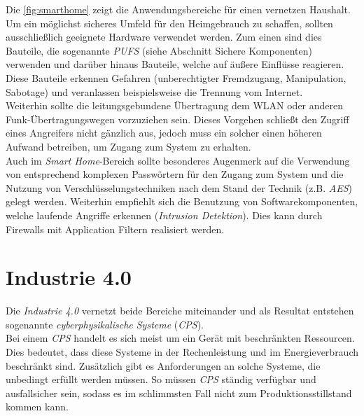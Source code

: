 \documentclass[conference]{IEEEtran}
\begin{document}
Die \autoref{fig:smarthome} zeigt die Anwendungsbereiche für einen vernetzen Haushalt.
Um ein möglichst sicheres Umfeld für den Heimgebrauch zu schaffen, sollten ausschließlich geeignete Hardware verwendet werden. Zum einen sind dies Bauteile, die sogenannte \textit{PUFS} (siehe Abschnitt Sichere Komponenten) verwenden und darüber hinaus Bauteile, welche auf äußere Einflüsse reagieren. Diese Bauteile erkennen Gefahren (unberechtigter Fremdzugang, Manipulation, Sabotage) und veranlassen beispielsweise die Trennung vom Internet\cite{landkrim}. \\
Weiterhin sollte die leitungsgebundene Übertragung dem WLAN oder anderen Funk-Übertragungswegen vorzuziehen sein. Dieses Vorgehen schließt den Zugriff eines Angreifers nicht gänzlich aus, jedoch muss ein solcher einen höheren Aufwand betreiben, um Zugang zum System zu erhalten. \\
Auch im \textit{Smart Home}-Bereich sollte besonderes Augenmerk auf die Verwendung von entsprechend komplexen Passwörtern für den Zugang zum System und die Nutzung von Verschlüsselungstechniken nach dem Stand der Technik (z.B. \textit{AES}) gelegt werden. Weiterhin empfiehlt sich die Benutzung von Softwarekomponenten, welche laufende Angriffe erkennen (\textit{Intrusion Detektion}). Dies kann durch Firewalls mit Application Filtern realisiert werden.   


\section{Industrie 4.0}
Die \textit{Industrie 4.0} vernetzt beide Bereiche miteinander und als Resultat entstehen sogenannte \textit{cyberphysikalische Systeme} (\textit{CPS}).\\
Bei einem \textit{CPS} handelt es sich meist um ein Gerät mit beschränkten Ressourcen. Dies bedeutet, dass diese Systeme in der Rechenleistung und im Energieverbrauch beschränkt sind. Zusätzlich gibt es Anforderungen an solche Systeme, die unbedingt erfüllt werden müssen. So müssen \textit{CPS} ständig verfügbar und ausfallsicher sein, sodass es im schlimmsten Fall nicht zum Produktionsstillstand kommen kann.
\end{document}
